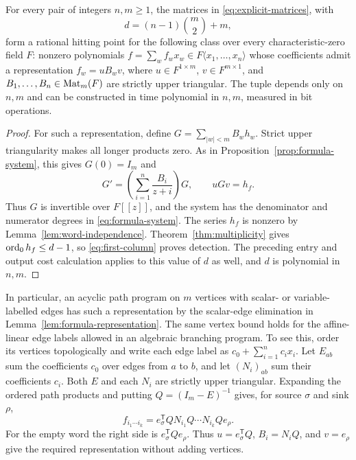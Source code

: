 \begin{samepage}
\begin{proposition}
For every pair of integers $n,m\ge1$,\label{prop:path-programs}\label{rem:path-programs}
the matrices in
\eqref{eq:explicit-matrices}, with
\[
 d=(n-1)\binom m2+m,
\]
form a rational hitting point for the following class over every
characteristic-zero field $F$: nonzero polynomials
$f=\sum_w f_wx_w\in F\langle x_1,\ldots,x_n\rangle$ whose coefficients admit
a representation $f_w=uB_wv$, where $u\in F^{1\times m}$,
$v\in F^{m\times1}$, and $B_1,\ldots,B_n\in\operatorname{Mat}_m(F)$ are strictly upper
triangular. The tuple depends only on $n,m$ and can be constructed in time
polynomial in $n,m$, measured in bit operations.
\end{proposition}
\end{samepage}

\begin{proof}
For such a representation, define
$G=\sum_{|w|<m}B_wh_w$. Strict upper triangularity makes all longer products
zero. As in Proposition~\ref{prop:formula-system}, this gives
$G(0)=I_m$ and
\[
 G'=\left(\sum_{i=1}^n\frac{B_i}{z+i}\right)G,
 \qquad uGv=h_f.
\]
Thus $G$ is invertible over $F[[z]]$, and the system has the denominator
and numerator degrees in \eqref{eq:formula-system}.
The series $h_f$ is nonzero by Lemma~\ref{lem:word-independence}.
Theorem~\ref{thm:multiplicity} gives $\operatorname{ord}_0 h_f\le d-1$, so
\eqref{eq:first-column} proves detection. The preceding entry and output
cost calculation applies to this value of $d$ as well, and $d$ is polynomial
in $n,m$.
\end{proof}

In particular, an acyclic path program on $m$ vertices with scalar- or
variable-labelled edges has such a representation by the scalar-edge
elimination in Lemma~\ref{lem:formula-representation}. The same vertex bound
holds for the affine-linear edge labels allowed in an algebraic branching
program. To see this, order its vertices topologically and write each edge
label as $c_0+\sum_{i=1}^n c_i x_i$. Let $E_{ab}$ sum the coefficients $c_0$
over edges from $a$ to $b$, and let $(N_i)_{ab}$ sum their coefficients $c_i$.
Both $E$ and each $N_i$ are strictly upper triangular. Expanding the ordered
path products and putting $Q=(I_m-E)^{-1}$ gives, for source $\sigma$ and
sink $\rho$,
\[
 f_{i_1\cdots i_k}
 =e_\sigma^{\mathsf T}Q N_{i_1}Q\cdots N_{i_k}Qe_\rho.
\]
For the empty word the right side is $e_\sigma^{\mathsf T}Qe_\rho$.
Thus $u=e_\sigma^{\mathsf T}Q$, $B_i=N_iQ$, and $v=e_\rho$ give the
required representation without adding vertices.
